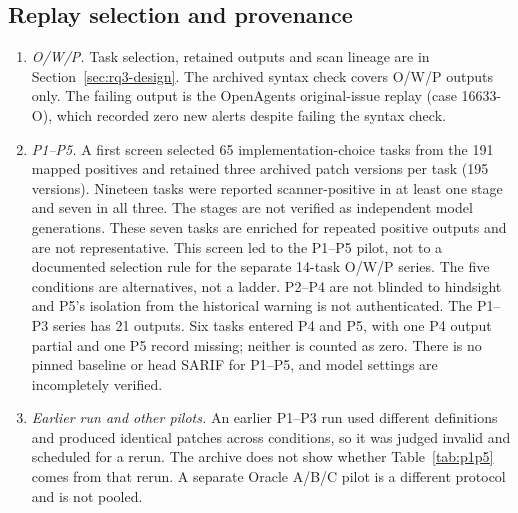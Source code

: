 \subsection*{Replay selection and provenance}
\begin{enumerate}\setlength{\itemsep}{1pt}
\item \emph{O/W/P.} Task selection, retained outputs and scan lineage are in Section~\ref{sec:rq3-design}. The archived syntax check covers O/W/P outputs only. The failing output is the OpenAgents original-issue replay (case 16633-O), which recorded zero new alerts despite failing the syntax check.
\item \emph{P1--P5.} A first screen selected 65 implementation-choice tasks from the 191 mapped positives and retained three archived patch versions per task (195 versions). Nineteen tasks were reported scanner-positive in at least one stage and seven in all three. The stages are not verified as independent model generations. These seven tasks are enriched for repeated positive outputs and are not representative. This screen led to the P1--P5 pilot, not to a documented selection rule for the separate 14-task O/W/P series. The five conditions are alternatives, not a ladder. P2--P4 are not blinded to hindsight and P5's isolation from the historical warning is not authenticated. The P1--P3 series has 21 outputs. Six tasks entered P4 and P5, with one P4 output partial and one P5 record missing; neither is counted as zero. There is no pinned baseline or head SARIF for P1--P5, and model settings are incompletely verified.
\item \emph{Earlier run and other pilots.} An earlier P1--P3 run used different definitions and produced identical patches across conditions, so it was judged invalid and scheduled for a rerun. The archive does not show whether Table~\ref{tab:p1p5} comes from that rerun. A separate Oracle A/B/C pilot is a different protocol and is not pooled.
\end{enumerate}


